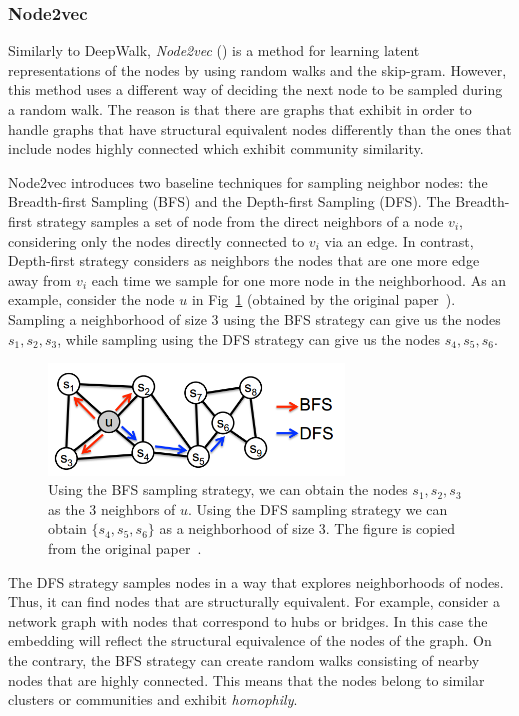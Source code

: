 \subsubsection{Node2vec}

Similarly to DeepWalk, \emph{Node2vec} (\cite{grover2016node2vec}) is a method
for learning latent representations of the nodes by using random walks and the
skip-gram. However, this method uses a different way of deciding the next node
to be sampled during a random walk. The reason is that there are graphs that
exhibit in order to handle graphs that have
structural equivalent nodes differently than the ones that include nodes
highly connected which exhibit community similarity.

Node2vec introduces two baseline techniques for sampling neighbor nodes: the
Breadth-first Sampling (BFS) and the Depth-first Sampling (DFS).
The Breadth-first strategy samples a set of node from the direct neighbors of a node $v_i$,
considering only the nodes directly connected to $v_i$ via an edge.
In contrast, Depth-first strategy considers as neighbors the nodes that are
one more edge away from $v_i$ each time we sample for one more node in the
neighborhood. As an example, consider the node $u$ in
Fig~\ref{sampling_strategies} (obtained by the original
paper~\cite{grover2016node2vec}). Sampling a neighborhood of size 3 using the
BFS strategy can give us the nodes $s_1, s_2, s_3$, while sampling using the DFS
strategy can give us the nodes $s_4, s_5, s_6$.
\begin{figure}
\begin{center}
\includegraphics[width=0.7\textwidth]{figures/sampling.png}
\end{center}
\caption{Using the BFS sampling strategy, we can obtain the nodes
$s_1, s_2, s_3$ as the 3 neighbors of $u$. Using the DFS sampling strategy we
can obtain $\{s_4, s_5, s_6\}$ as a neighborhood of size 3. The figure is copied
from the original paper~\cite{grover2016node2vec}.}
\label{sampling_strategies}
\end{figure}
The DFS strategy samples nodes in a way that explores neighborhoods of nodes.
Thus, it can find nodes that are structurally equivalent. For example, consider
a network graph with nodes that correspond to hubs or bridges. In this case the
embedding will reflect the structural equivalence of the nodes of the graph.
On the contrary, the BFS strategy can create random walks consisting of nearby
nodes that are highly connected. This means that the nodes belong to similar
clusters or communities and exhibit \emph{homophily}.

